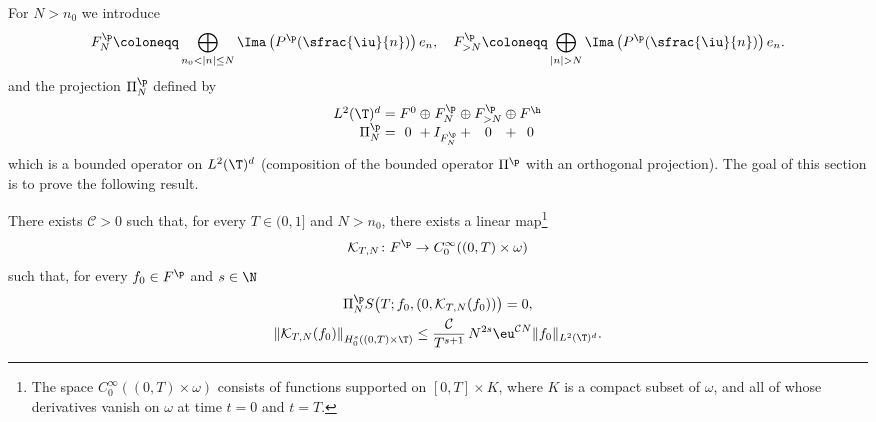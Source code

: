 
For $N>n_0$ we introduce
\begin{equation} \label{def:FpN}
F^\p_N \coloneqq \bigoplus\limits_{n_0 < |n| \leq N} \Ima\left(P^\p(\sfrac{\iu}{n})\right) e_n,
\quad
F^\p_{>N} \coloneqq\bigoplus\limits_{|n|>N } \Ima\left(P^\p(\sfrac{\iu}{n})\right) e_n.
\end{equation}
and the projection $\Pi^\p_N$ defined by
\[
\begin{array}{r@{}c@{}c@{}c@{}c@{}c@{}c@{}c@{}c}
L^2(\T)^d & {}={} & F^0 & {}\oplus{} & F^\p_N & {}\oplus{} & F^\p_{>N} & {}\oplus{} & F^\h \\
\Pi^\p_N &{} = {}& 0 &{} + {}& I_{F^\p_N} &{} +{} & 0 & {}+{} & 0
\end{array}
\]
which is a bounded operator on $L^2(\T)^d$ (composition of the bounded operator $\Pi^\p$ with an orthogonal projection).
The goal of this section is to prove the following result.

\begin{prop} \label{Prop:FNPF}
There exists $\mathcal{C}>0$ such that, for every $T \in(0,1]$ and $N>n_0$, there exists a linear map\footnote{The space $C_0^\infty((0,T)\times \omega)$ consists of functions supported on $[0,T]\times K$, where $K$ is a compact subset of $\omega$, and
all of whose derivatives vanish on $\omega$ at time $t=0$ and $t=T$.}
\[
\mathcal{K}_{T,N}\colon F^\p \to C^\infty_0((0,T) \times \omega)
\]
such that, for every $f_0 \in F^\p$ and $s \in\N$
\begin{gather*}
\Pi^\p_N S \bigl(T ; f_0, \left(0,\mathcal{K}_{T,N}(f_0)\right) \bigr) = 0,\\
\left\| \mathcal{K}_{T,N}(f_0) \right\|_{H_0^s((0,T)\times\T)} \leq \frac{\mathcal{C} }{ T^{s+1} }\, N^{2s} \eu^{\mathcal{C} N} \|f_0\|_{L^2(\T)^d}.
\end{gather*}
\end{prop}

